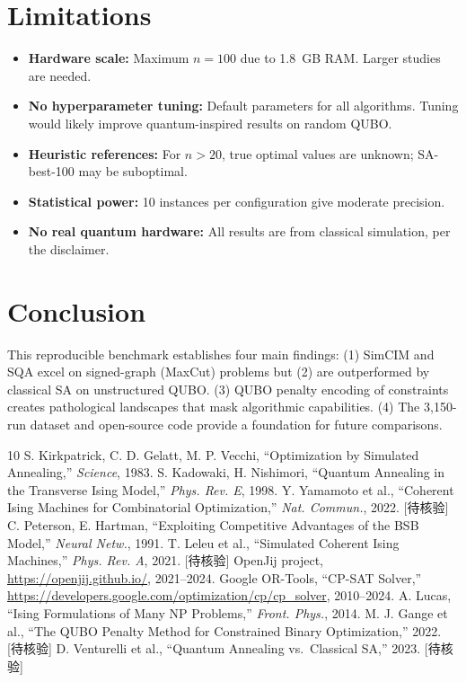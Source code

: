 \documentclass[10pt,twocolumn]{article}
\begin{document}
\section{Limitations}
\label{sec:limitations}
\begin{itemize}
\item \textbf{Hardware scale:} Maximum $n=100$ due to 1.8~GB RAM. Larger studies are needed.
\item \textbf{No hyperparameter tuning:} Default parameters for all algorithms. Tuning would likely improve quantum-inspired results on random QUBO.
\item \textbf{Heuristic references:} For $n>20$, true optimal values are unknown; SA-best-100 may be suboptimal.
\item \textbf{Statistical power:} 10 instances per configuration give moderate precision.
\item \textbf{No real quantum hardware:} All results are from classical simulation, per the disclaimer.
\end{itemize}

\section{Conclusion}
\label{sec:conclusion}

This reproducible benchmark establishes four main findings: (1) SimCIM and SQA excel on signed-graph (MaxCut) problems but (2) are outperformed by classical SA on unstructured QUBO. (3) QUBO penalty encoding of constraints creates pathological landscapes that mask algorithmic capabilities. (4) The 3,150-run dataset and open-source code provide a foundation for future comparisons.

\begin{thebibliography}{10}
 S. Kirkpatrick, C. D. Gelatt, M. P. Vecchi, ``Optimization by Simulated Annealing,'' \emph{Science}, 1983.
 S. Kadowaki, H. Nishimori, ``Quantum Annealing in the Transverse Ising Model,'' \emph{Phys. Rev. E}, 1998.
 Y. Yamamoto et al., ``Coherent Ising Machines for Combinatorial Optimization,'' \emph{Nat. Commun.}, 2022. [待核验]
 C. Peterson, E. Hartman, ``Exploiting Competitive Advantages of the BSB Model,'' \emph{Neural Netw.}, 1991.
 T. Leleu et al., ``Simulated Coherent Ising Machines,'' \emph{Phys. Rev. A}, 2021. [待核验]
 OpenJij project, \url{https://openjij.github.io/}, 2021--2024.
 Google OR-Tools, ``CP-SAT Solver,'' \url{https://developers.google.com/optimization/cp/cp_solver}, 2010--2024.
 A. Lucas, ``Ising Formulations of Many NP Problems,'' \emph{Front. Phys.}, 2014.
 M. J. Gange et al., ``The QUBO Penalty Method for Constrained Binary Optimization,'' 2022. [待核验]
 D. Venturelli et al., ``Quantum Annealing vs.\ Classical SA,'' 2023. [待核验]
\end{thebibliography}
\end{document}
